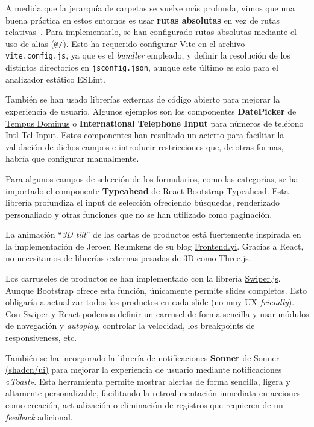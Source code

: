 \documentclass[11pt]{article}
\begin{document}
      A medida que la jerarquía de carpetas se vuelve más profunda, vimos que una
      buena práctica en estos entornos es usar \textbf{rutas absolutas} en vez de
      rutas relativas~\cite{salteadorneo_alias}. Para implementarlo, se han
      configurado rutas absolutas mediante el uso de alias (\texttt{@/}). Esto ha
      requerido configurar Vite en el archivo \texttt{vite.config.js}, ya que es el
      \textit{bundler} empleado, y definir la resolución de los distintos directorios
      en \texttt{jsconfig.json}, aunque este último es solo para el analizador
      estático ESLint.

      También se han usado librerías externas de código abierto para mejorar la
      experiencia de usuario. Algunos ejemplos son los componentes
      \textbf{DatePicker} de \href{https://getdatepicker.com}{Tempus Dominus} o
      \textbf{International Telephone Input} para números de teléfono
      \href{https://getdatepicker.com}{Intl-Tel-Input}. Estos componentes han
      resultado un acierto para facilitar la validación de dichos campos e introducir
      restricciones que, de otras formas, habría que configurar manualmente.

      Para algunos campos de selección de los formularios, como las categorías, se ha
      importado el componente \textbf{Typeahead} de
      \href{https://github.com/ericgio/react-bootstrap-typeahead}{React Bootstrap
          Typeahead}. Esta librería profundiza el input de selección ofreciendo
      búsquedas, renderizado personaliado y otras funciones que no se han utilizado
      como paginación.

      La animación ``\textit{3D tilt}'' de las cartas de productos está fuertemente
      inspirada en la implementación de Jeroen Reumkens de su blog
      \href{https://www.frontend.fyi/tutorials/css-3d-perspective-animations}{Frontend.yi}.
      Gracias a React, no necesitamos de librerías externas pesadas de 3D como
      Three.js.

      Los carruseles de productos se han implementado con la librería
      \href{https://swiperjs.com/}{Swiper.js}. Aunque Bootstrap ofrece esta función,
      únicamente permite slides completos. Esto obligaría a actualizar todos los
      productos en cada slide (no muy UX-\textit{friendly}). Con Swiper y React
      podemos definir un carrusel de forma sencilla y usar módulos de navegación y
      \textit{autoplay}, controlar la velocidad, los breakpoints de responsiveness,
      etc.

      También se ha incorporado la librería de notificaciones \textbf{Sonner} de
      \href{https://sonner.emilkowal.ski}{Sonner (shadcn/ui)} para mejorar la
      experiencia de usuario mediante notificaciones «\textit{Toast}». Esta
      herramienta permite mostrar alertas de forma sencilla, ligera y altamente
      personalizable, facilitando la retroalimentación inmediata en acciones como
      creación, actualización o eliminación de registros que requieren de un
      \textit{feedback} adicional.
\end{document}
